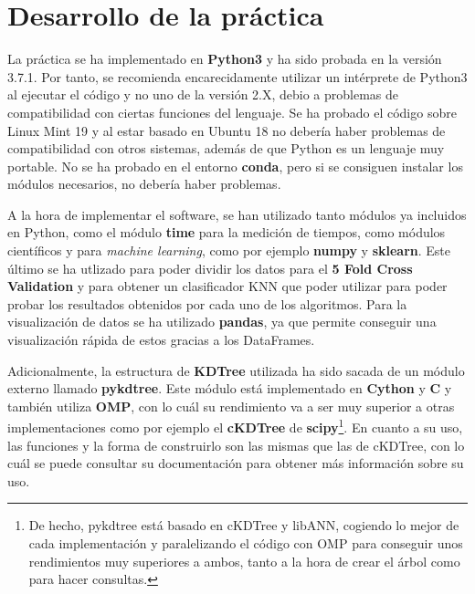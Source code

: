 \documentclass[11pt,a4paper]{article}
\begin{document}
\newpage

\section{Desarrollo de la práctica}

La práctica se ha implementado en \textbf{Python3} y ha sido probada en la versión 3.7.1. Por tanto, se recomienda
encarecidamente utilizar un intérprete de Python3 al ejecutar el código y no uno de la versión 2.X, debio a problemas
de compatibilidad con ciertas funciones del lenguaje. Se ha probado el código sobre Linux Mint 19 y al estar basado en
Ubuntu 18 no debería haber problemas de compatibilidad con otros sistemas, además de que Python es un lenguaje muy portable.
No se ha probado en el entorno \textbf{conda}, pero si se consiguen instalar los módulos necesarios, no debería haber
problemas.

A la hora de implementar el software, se han utilizado tanto módulos ya incluidos en Python, como el módulo \textbf{time}
para la medición de tiempos, como módulos científicos y para \textit{machine learning}, como por ejemplo \textbf{numpy} y
\textbf{sklearn}. Este último se ha utlizado para poder dividir los datos para el \textbf{5 Fold Cross Validation}
y para obtener un clasificador KNN que poder utilizar para poder probar los resultados obtenidos por cada uno de los
algoritmos. Para la visualización de datos se ha utilizado \textbf{pandas}, ya que permite conseguir una visualización rápida
de estos gracias a los DataFrames.

Adicionalmente, la estructura de \textbf{KDTree} utilizada ha sido sacada de un módulo externo llamado
\textbf{pykdtree}\cite{pykdtree}. Este módulo está implementado en \textbf{Cython} y \textbf{C} y también utiliza
\textbf{OMP}, con lo cuál su rendimiento va a ser muy superior a otras implementaciones como por ejemplo el \textbf{cKDTree}
de \textbf{scipy}\footnote{De hecho, pykdtree está basado en cKDTree y libANN, cogiendo lo
mejor de cada implementación y paralelizando el código con OMP para conseguir unos rendimientos muy superiores a ambos,
tanto a la hora de crear el árbol como para hacer consultas.}. En cuanto a su uso, las funciones y la forma de construirlo
son las mismas que las de cKDTree, con lo cuál se puede consultar su documentación\cite{ckdtree} para obtener más información
sobre su uso.
\end{document}
